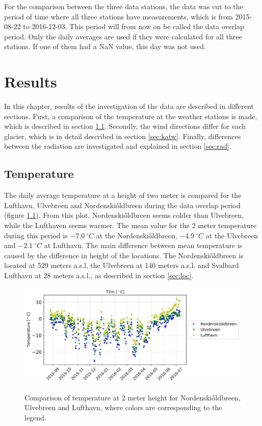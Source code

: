 \documentclass[11pt]{report}
\begin{document}
For the comparison between the three data stations, the data was cut to the period of time where all three stations have measurements, which is from 2015-08-22 to 2016-12-03. This period will from now on be called the data overlap period. Only the daily averages are used if they were calculated for all three stations. If one of them had a NaN value, this day was not used.


\newpage
\chapter{Results}\label{sec:results}
In this chapter, results of the investigation of the data are described in different sections. First, a comparison of the temperature at the weather stations is made, which is described in section \ref{sec:T}. Secondly, the wind directions differ for each glacier, which is in detail described in section \ref{sec:katw}. Finally, differences between the radiation are investigated and explained in section \ref{sec:rad}.

\section{Temperature} \label{sec:T}
The daily average temperature at a height of two meter is compared for the Lufthavn, Ulvebreen and Nordenski\H{o}ldbreen during the data overlap period (figure \ref{fig:T2m}). From this plot, Nordenski\H{o}ldbreen seems colder than Ulvebreen, while the Lufthaven seems warmer. The mean value for the 2 meter temperature during this period is $\SI{-7.0}{^{\circ}C}$ at the Nordenski\H{o}ldbreen, $\SI{-4.9}{^{\circ}C}$ at the Ulvebreen and $\SI{-2.1}{^{\circ}C}$ at Lufthavn. The main difference between mean temperature is caused by the difference in height of the locations. The Nordenski\H{o}ldbreen is located at 529 meters a.s.l, the Ulvebreen at 140 meters a.s.l. and Svalbard Lufthavn at 28 meters a.s.l., as described in section \ref{sec:loc}. 

\begin{figure}[h]
\centering{}
    \includegraphics[scale=1, width=1\textwidth]{T2m.jpg}
    \label{fig:T2m}
    \caption{Comparison of temperature at 2 meter height for Nordenski\H{o}ldbreen, Ulvebreen and Lufthavn, where colors are corresponding to the legend.}
\end{figure}
\end{document}
